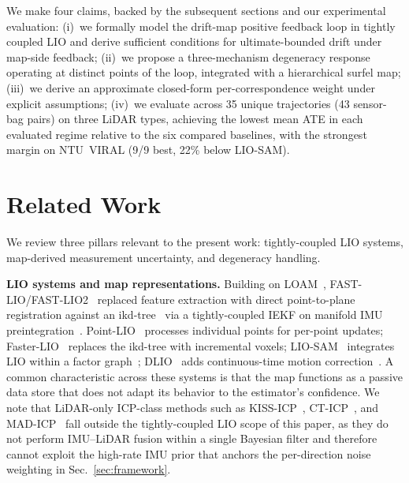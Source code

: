 \documentclass[conference]{IEEEtran}
\begin{document}
We make four claims, backed by the subsequent sections and our
experimental evaluation: (i)~we formally model the drift-map positive
feedback loop in tightly coupled LIO and derive sufficient conditions
for ultimate-bounded drift under map-side feedback; (ii)~we propose a
three-mechanism degeneracy response operating at distinct points of
the loop, integrated with a hierarchical surfel map; (iii)~we derive
an approximate closed-form per-correspondence weight under explicit
assumptions; (iv)~we evaluate across 35 unique trajectories (43 sensor-bag pairs)
on three LiDAR types, achieving the lowest mean ATE in each evaluated
regime relative to the six compared baselines, with the strongest
margin on NTU~VIRAL (9/9 best, 22\% below LIO-SAM).

\section{Related Work}\label{sec:related}

We review three pillars relevant to the present work: tightly-coupled
LIO systems, map-derived measurement uncertainty, and degeneracy
handling.

\textbf{LIO systems and map representations.}
Building on LOAM~\cite{zhang2014loam}, FAST-LIO/FAST-LIO2~\cite{xu2021fastlio,
xu2022fastlio2} replaced feature extraction with direct point-to-plane
registration against an ikd-tree~\cite{cai2022ikdtree} via a
tightly-coupled IEKF on manifold IMU
preintegration~\cite{forster2017manifold}. Point-LIO~\cite{he2023pointlio}
processes individual points for per-point updates; Faster-LIO~\cite{bai2022fasterlio}
replaces the ikd-tree with incremental voxels; LIO-SAM~\cite{shan2020liosam}
integrates LIO within a factor graph~\cite{dellaert2017factor};
DLIO~\cite{chen2023dlio} adds continuous-time motion
correction~\cite{dellenbach2022cticp}. A common characteristic across
these systems is that the map functions as a passive data store that
does not adapt its behavior to the estimator's confidence.
We note that LiDAR-only ICP-class methods such as
KISS-ICP~\cite{vizzo2023kissicp}, CT-ICP~\cite{dellenbach2022cticp},
and MAD-ICP~\cite{ferrari2024madicp} fall outside the tightly-coupled
LIO scope of this paper, as they do not perform IMU--LiDAR fusion
within a single Bayesian filter and therefore cannot exploit the
high-rate IMU prior that anchors the per-direction noise weighting in
Sec.~\ref{sec:framework}.
\end{document}
